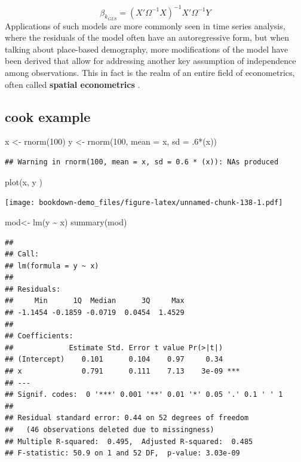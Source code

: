 \documentclass[
]{article}
\newenvironment{Shaded}{\begin{snugshade}}{\end{snugshade}}
\newcommand{\AttributeTok}[1]{\textcolor[rgb]{0.77,0.63,0.00}{#1}}
\newcommand{\DecValTok}[1]{\textcolor[rgb]{0.00,0.00,0.81}{#1}}
\newcommand{\FunctionTok}[1]{\textcolor[rgb]{0.00,0.00,0.00}{#1}}
\newcommand{\NormalTok}[1]{#1}
\newcommand{\OtherTok}[1]{\textcolor[rgb]{0.56,0.35,0.01}{#1}}
\newcommand{\SpecialCharTok}[1]{\textcolor[rgb]{0.00,0.00,0.00}{#1}}
\begin{document}
\[\beta_{k_{GLS}} = (X' \Omega^{-1} X)^{-1} X' \Omega^{-1} Y\] Applications of such models are more commonly seen in time series analysis, where the residuals of the model often have an autoregressive form, but when talking about place-based demography, more modifications of the model have been derived that allow for addressing another key assumption of independence among observations. This in fact is the realm of an entire field of econometrics, often called \textbf{spatial econometrics} \citep{anselin_spatial_1988, chi_spatial_2020, elhorst_spatial_2014, lesage_introduction_2009}.

\hypertarget{cook-example}{%
\subsection{cook example}\label{cook-example}}

\begin{Shaded}
\begin{Highlighting}[]
\NormalTok{x }\OtherTok{\textless{}{-}} \FunctionTok{rnorm}\NormalTok{(}\DecValTok{100}\NormalTok{)}
\NormalTok{y }\OtherTok{\textless{}{-}} \FunctionTok{rnorm}\NormalTok{(}\DecValTok{100}\NormalTok{, }\AttributeTok{mean =}\NormalTok{ x, }\AttributeTok{sd =}\NormalTok{ .}\DecValTok{6}\SpecialCharTok{*}\NormalTok{(x))}
\end{Highlighting}
\end{Shaded}

\begin{verbatim}
## Warning in rnorm(100, mean = x, sd = 0.6 * (x)): NAs produced
\end{verbatim}

\begin{Shaded}
\begin{Highlighting}[]
\FunctionTok{plot}\NormalTok{(x, y )}
\end{Highlighting}
\end{Shaded}

\texttt{[image: bookdown-demo\_files/figure-latex/unnamed-chunk-138-1.pdf]}

\begin{Shaded}
\begin{Highlighting}[]
\NormalTok{mod}\OtherTok{\textless{}{-}} \FunctionTok{lm}\NormalTok{(y }\SpecialCharTok{\textasciitilde{}}\NormalTok{ x)}
\FunctionTok{summary}\NormalTok{(mod)}
\end{Highlighting}
\end{Shaded}

\begin{verbatim}
## 
## Call:
## lm(formula = y ~ x)
## 
## Residuals:
##     Min      1Q  Median      3Q     Max 
## -1.1454 -0.1859 -0.0719  0.0454  1.4529 
## 
## Coefficients:
##             Estimate Std. Error t value Pr(>|t|)    
## (Intercept)    0.101      0.104    0.97     0.34    
## x              0.791      0.111    7.13    3e-09 ***
## ---
## Signif. codes:  0 '***' 0.001 '**' 0.01 '*' 0.05 '.' 0.1 ' ' 1
## 
## Residual standard error: 0.44 on 52 degrees of freedom
##   (46 observations deleted due to missingness)
## Multiple R-squared:  0.495,  Adjusted R-squared:  0.485 
## F-statistic: 50.9 on 1 and 52 DF,  p-value: 3.03e-09
\end{verbatim}
\end{document}
